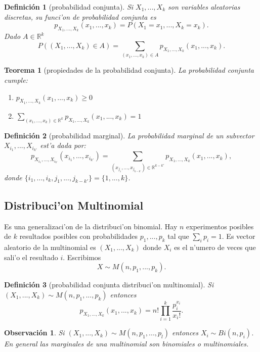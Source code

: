 \documentclass[a4paper,spanish]{article}
\newcommand{\R}[0]{\mathbb{R}}
\newtheorem{teo}{Teorema}
\newtheorem{defi}{Definici\'on}
\newtheorem{obs}{Observaci\'on}
\begin{document}
\begin{defi}[probabilidad conjunta]
Si $X_1,...,X_k$ son variables aleatorias discretas, su \emph{funci'on de
probabilidad conjunta} es 
$$p_{X_1,...,X_k}(x_1,...,x_k) = P(X_1 = x_1,...,X_k = x_k).$$
Dado $A \in \R^k$ 
$$P((X_1,...,X_k) \in A) = 
	\sum_{(x_1,...,x_k) \in A} p_{X_1,...,X_k}(x_1,...,x_k).$$
\end{defi}

\begin{teo}[propiedades de la probabilidad conjunta]
La probabilidad conjunta cumple:
\begin{enumerate}
\item $p_{X_1,...,X_k}(x_1,...,x_k) \geq 0$
\item $\sum_{(x_1,...,x_k) \in \R^k} p_{X_1,...,X_k}(x_1,...,x_k) = 1$
\end{enumerate}
\end{teo}

\begin{defi}[probabilidad marginal]
La \emph{probabilidad marginal} de un subvector $X_{i_1},...,X_{i_{k'}}$
est'a dada por:
$$p_{X_{i_1},...,X_{i_{k'}}}(x_{i_1},...,x_{i_{k'}}) = 
	\sum_{(x_{j_1},...,x_{j_{k-k'}}) \in \R^{k-k'}} 
		p_{X_1,...,X_k}(x_1,...,x_k),$$
donde $\{i_1,...,i_k,j_1,...,j_{k-k'}\} = \{1,...,k\}$.
\end{defi}

\subsection{Distribuci'on Multinomial}

Es una generalizaci'on de la distribuci'on binomial. Hay $n$ experimentos
posibles de $k$ resultados posibles con probabilidades $p_1,...,p_k$ tal que
$\sum_i p_i = 1$. Es vector aleatorio de la multinomial es $(X_1,...,X_k)$
donde $X_i$ es el n'umero de veces que sali'o el resultado $i$. Escribimos 
$$X \sim M(n,p_1,...,p_k).$$

\begin{defi}[probabilidad conjunta distribuci'on multinomial]
Si $(X_1,...,X_k) \sim M(n,p_1,...,p_k)$ entonces
$$p_{X_1,...,X_k}(x_1,...,x_k) = n! \prod_{i=1}^k \frac{p_i^{x_i}}{x_i!}.$$
\end{defi}

\begin{obs}
Si $(X_1,...,X_k) \sim M(n,p_1,...,p_l)$ entonces $X_i \sim Bi(n,p_i)$. En
general las marginales de una multinomial son binomiales o multinomiales.
\end{obs}
\end{document}
